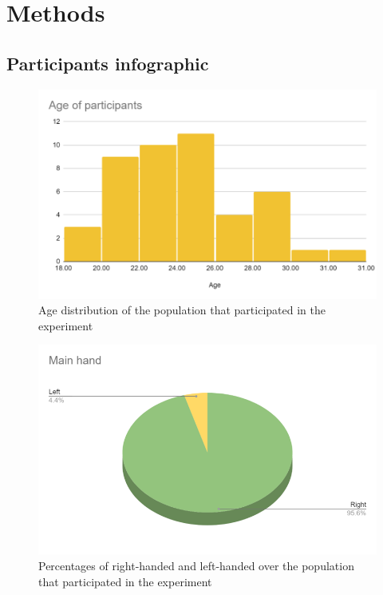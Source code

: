 \section{Methods}
\label{sec:appendix_A2}

\subsection{Participants infographic}
\label{sec:appendix_A2.1}

\begin{figure}[!htb]
\includegraphics[width=14cm]{img/appendix/age_distribution.png}
\centering
\caption{Age distribution of the population that participated in the experiment}\label{fig:age_distribution}
\end{figure}

\begin{figure}[!htb]
\includegraphics[width=14cm]{img/appendix/right_hand.png}
\centering
\caption{Percentages of right-handed and left-handed over the population that participated in the experiment}\label{fig:right_hand}
\end{figure}

